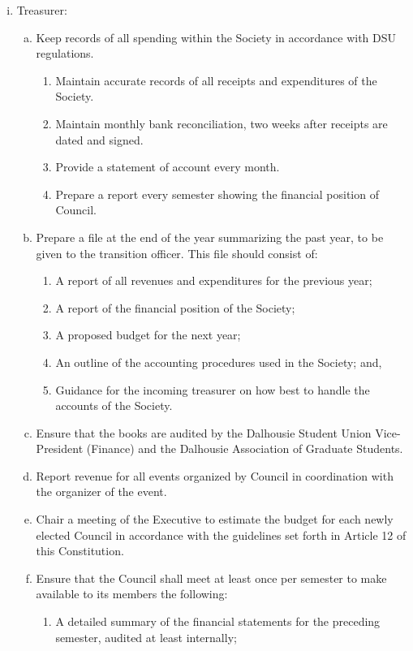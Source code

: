 \documentclass[]{report}
\begin{document}
\begin{enumerate}
\begin{enumerate}[i.]
			\item Treasurer:
			\begin{enumerate}[(a)]
				\item Keep records of all spending within the Society in accordance with DSU regulations.
					\begin{enumerate}[(1)]
						\item Maintain accurate records of all receipts and expenditures of the Society.
						\item Maintain monthly bank reconciliation, two weeks after receipts are dated and signed.
						\item Provide a statement of account every month.
						\item Prepare a report every semester showing the financial position of Council.
					\end{enumerate}
				\item Prepare a file at the end of the year summarizing the past year, to be given to the transition officer. This file should consist of:
					\begin{enumerate}[(1)]
						\item A report of all revenues and expenditures for the previous year;
						\item A report of the financial position of the Society;
						\item A proposed budget for the next year;
						\item An outline of the accounting procedures used in the Society; and,
						\item Guidance for the incoming treasurer on how best to handle the accounts of the Society.
					\end{enumerate}
				\item Ensure that the books are audited by the Dalhousie Student Union Vice-President (Finance) and the Dalhousie Association of Graduate Students.
				\item Report revenue for all events organized by Council in coordination with the organizer of the event.
				\item Chair a meeting of the Executive to estimate the budget for each newly elected Council in accordance with the guidelines set forth in Article 12 of this Constitution.
				\item Ensure that the Council shall meet at least once per semester to make available to its members the following:
					\begin{enumerate}[(1)]
						\item A detailed summary of the financial statements for the preceding semester, audited at least internally;

\end{enumerate}
\end{enumerate}
\end{enumerate}
\end{enumerate}
\end{document}
